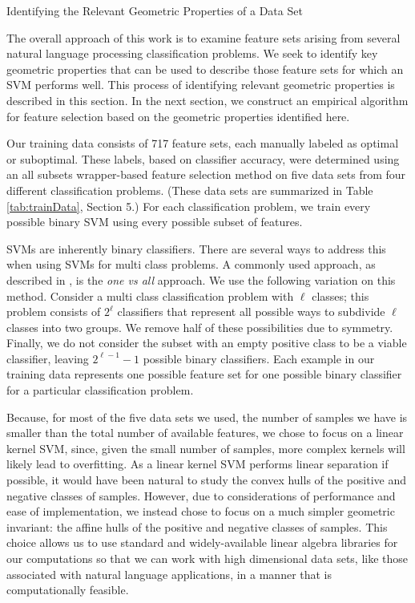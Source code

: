 \documentclass{llncs}
\begin{document}
\begin{section}{Identifying the Relevant Geometric Properties of a Data Set}
\label{sec:geometry}

The overall approach of this work is to examine feature sets arising from  several natural language processing classification problems. We seek to identify key geometric properties that can be used to describe those feature sets for which an SVM performs well. This process of identifying relevant geometric properties is described in this section. In the next section, we construct an empirical algorithm for feature selection based on the geometric properties identified here.

Our training data consists of 717 feature sets, each manually labeled as optimal or suboptimal. These labels, based on classifier accuracy, were determined using an all subsets wrapper-based feature selection method on five data sets from four different classification problems. (These data sets are summarized in Table \ref{tab:trainData}, Section 5.) For each classification problem, we train every possible binary SVM using every possible subset of features. 

SVMs are inherently binary classifiers. There are several ways to address this when using SVMs for  multi class problems. A commonly used approach, as described in \cite{HanKamber}, is the {\em one vs all} approach. We use the following variation on this method. Consider a multi class classification problem with $\ell$ classes; this problem consists of $2^{\ell}$ classifiers that represent all possible ways to subdivide $\ell$ classes into two groups. We remove half of these possibilities due to symmetry. Finally, we do not consider the subset with an empty positive class to be a viable classifier, leaving $2^{\ell -1}-1$ possible binary classifiers. Each example in our training data represents one possible feature set for one possible binary classifier for a particular classification problem.

Because, for most of the five data sets we used, the number of samples we have is smaller than the total number of available features, we chose to focus on a linear kernel SVM, since, given the small number of samples, more complex kernels will likely lead to overfitting. As a linear kernel SVM performs linear separation if possible, it would have been natural to study the convex hulls of the positive and negative classes of samples. However, due to considerations of performance and ease of implementation, we instead chose to focus on a much simpler geometric invariant: the affine hulls of the positive and negative classes of samples. This choice allows us to use standard and widely-available linear algebra libraries for our computations so that we can work with high dimensional data sets, like those associated with natural language applications, in a manner that is computationally feasible.


\end{section}
\end{document}
